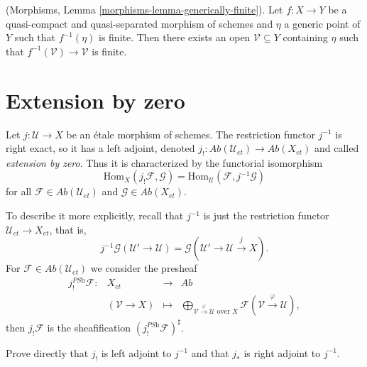 \begin{lemma}
\label{lemma-generically-finite}
(Morphisms, Lemma \ref{morphisms-lemma-generically-finite}).
Let $f: X\to Y$ be a quasi-compact and quasi-separated morphism of schemes and
$\eta$ a generic point of $Y$ such that $f^{-1}(\eta)$ is finite. Then there
exists an open $\mathcal{V} \subseteq Y$ containing $\eta$ such that
$f^{-1}(\mathcal{V})\to \mathcal{V}$ is finite.
\end{lemma}






\section{Extension by zero}
\label{section-extension-by-zero}

\begin{definition}
\label{definition-extension-zero}
Let $j: \mathcal{U} \to X$ be an \'etale morphism of schemes. The restriction
functor $j^{-1}$ is right exact, so it has a left adjoint, denoted
$j_! : \textit{Ab}(\mathcal{U}_{et})\to \textit{Ab}(X_{et})$
and called {\it extension by zero}.
Thus it is characterized by the functorial isomorphism
$$
\text{Hom}_X(j_!\mathcal{F}, \mathcal{G}) =
\text{Hom}_\mathcal{U}(\mathcal{F}, j^{-1}\mathcal{G})
$$
for all $\mathcal{F} \in \textit{Ab}(\mathcal{U}_{et})$ and
$\mathcal{G} \in \textit{Ab}(X_{et})$.
\end{definition}

\noindent
To describe it more explicitly, recall that $j^{-1}$ is just the restriction
functor $\mathcal{U}_{et}\to X_{et}$, that is,
$$
j^{-1}\mathcal{G}(\mathcal{U}'\to \mathcal{U}) = \mathcal{G}
\left(\mathcal{U}'\to \mathcal{U} \xrightarrow{j} X\right).
$$
For $\mathcal{F} \in \textit{Ab}(\mathcal{U}_{et})$ we consider the presheaf
$$
\begin{matrix}
j_!^{\textit{PSh}}\mathcal{F}: & X_{et} &\longrightarrow & \textit{Ab}\\
& (\mathcal{V}\to X) & \longmapsto & \displaystyle
\bigoplus_{\mathcal{V}\xrightarrow{\varphi} \mathcal{U}\text{ over }X}
\mathcal{F}(\mathcal{V}\xrightarrow{\varphi}\mathcal{U}),
\end{matrix}
$$
then $j_!\mathcal{F}$ is the sheafification
$\left(j_!^{\textit{PSh}}\mathcal{F}\right)^\sharp$.

\begin{exercise}
\label{exercise-jshriek-direct}
Prove directly that $j_!$ is left adjoint to $j^{-1}$ and that $j_*$ is right
adjoint to $j^{-1}$.
\end{exercise}

